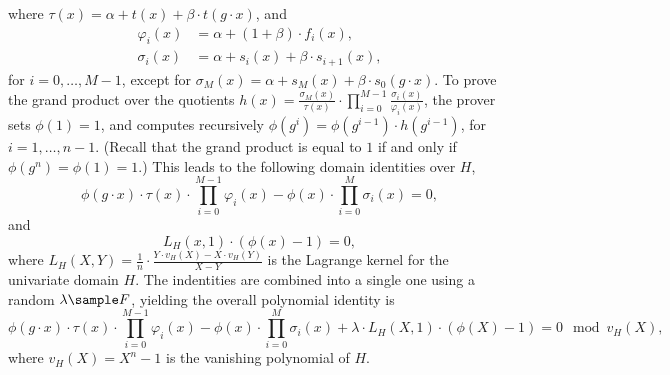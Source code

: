 \documentclass[11pt]{article}
\theoremstyle{definition}
\theoremstyle{remark}
\begin{document}
where $\tau(x) = \alpha + t(x) + \beta\cdot t(g\cdot x)$, and 
\begin{align*}
\varphi_i (x) &=\alpha +  (1+\beta)\cdot f_i(x),
\\
\sigma_{i}(x) &= \alpha + s_i(x) + \beta\cdot s_{i+1}(x),
\end{align*}
for $i=0,\ldots, M-1$, except for $\sigma_{M}(x) =  \alpha + s_M(x) + \beta\cdot s_0(g\cdot x)$.
To prove the grand product over the quotients $h(x) =  \frac{\sigma_{M}(x)}{\tau(x)}\cdot \prod_{i=0}^{M-1} \frac{\sigma_{i}(x)}{\varphi_{i}(x)} $, the prover sets $\phi(1) = 1$, and computes recursively $\phi(g^i )= \phi(g^{i-1})\cdot h(g^{i-1})$, for $i=1,\ldots, n-1$.
(Recall that the grand product is equal to $1$ if and only if $\phi(g^n) = \phi(1) = 1$.)
This leads to the following domain identities over $H$,
\begin{equation*}
\phi(g\cdot x) \cdot \tau(x) \cdot \prod_{i=0}^{M-1} \varphi_i (x)
- \phi(x)\cdot \prod_{i=0}^M \sigma_i (x)
= 0,
\end{equation*}
and
\begin{equation*}
L_H(x, 1)\cdot (\phi(x) - 1) = 0,
\end{equation*}
where $L_H(X, Y) = \frac{1}{n}\cdot \frac{Y\cdot v_H(X) - X\cdot v_H(Y)}{X - Y}$ is the Lagrange kernel for the univariate domain $H$.
The indentities are combined into a single one using a random $\lambda \sample F$, yielding the overall polynomial identity is
\begin{equation*}
\phi(g\cdot x) \cdot \tau(x) \cdot \prod_{i=0}^{M-1} \varphi_i (x)
- \phi(x)\cdot \prod_{i=0}^M \sigma_i (x)
+  \lambda \cdot L_H(X, 1)\cdot (\phi(X) - 1) = 0  \mod v_H(X),
\end{equation*}
where $v_H(X) = X^n - 1$ is the vanishing polynomial of $H$.
\end{document}
